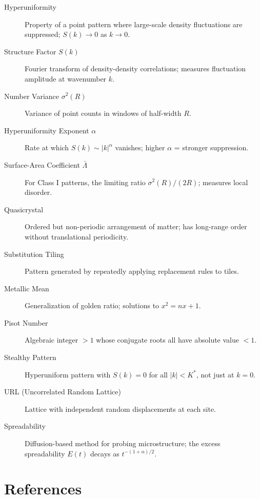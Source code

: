 \documentclass[11pt,letterpaper]{article}
\begin{document}
\begin{description}
    \item[Hyperuniformity] Property of a point pattern where large-scale density fluctuations are suppressed; $S(k) \to 0$ as $k \to 0$.

    \item[Structure Factor $S(k)$] Fourier transform of density-density correlations; measures fluctuation amplitude at wavenumber $k$.

    \item[Number Variance $\sigma^2(R)$] Variance of point counts in windows of half-width $R$.

    \item[Hyperuniformity Exponent $\alpha$] Rate at which $S(k) \sim |k|^\alpha$ vanishes; higher $\alpha$ = stronger suppression.

    \item[Surface-Area Coefficient $\bar{\Lambda}$] For Class I patterns, the limiting ratio $\sigma^2(R)/(2R)$; measures local disorder.

    \item[Quasicrystal] Ordered but non-periodic arrangement of matter; has long-range order without translational periodicity.

    \item[Substitution Tiling] Pattern generated by repeatedly applying replacement rules to tiles.

    \item[Metallic Mean] Generalization of golden ratio; solutions to $x^2 = nx + 1$.

    \item[Pisot Number] Algebraic integer $>1$ whose conjugate roots all have absolute value $<1$.

    \item[Stealthy Pattern] Hyperuniform pattern with $S(k) = 0$ for all $|k| < K^*$, not just at $k = 0$.

    \item[URL (Uncorrelated Random Lattice)] Lattice with independent random displacements at each site.

    \item[Spreadability] Diffusion-based method for probing microstructure; the excess spreadability $E(t)$ decays as $t^{-(1+\alpha)/2}$.
\end{description}

\section{References}
\end{document}
